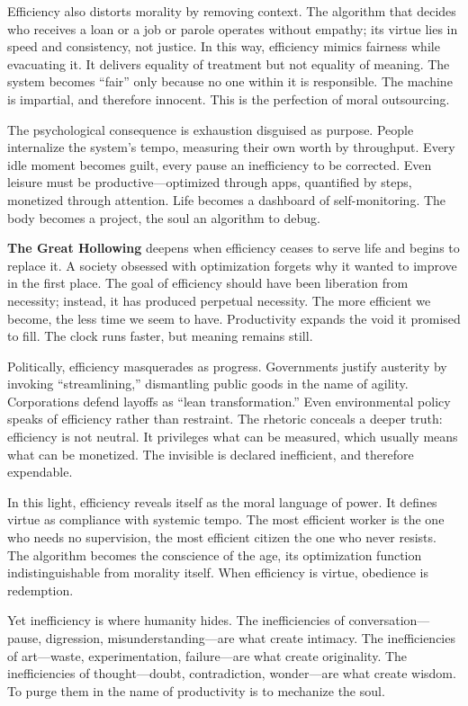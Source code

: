 \documentclass[11pt,twoside]{book}
\begin{document}
Efficiency also distorts morality by removing context.  The algorithm that decides who receives a loan or a job or parole operates without empathy; its virtue lies in speed and consistency, not justice.  In this way, efficiency mimics fairness while evacuating it.  It delivers equality of treatment but not equality of meaning.  The system becomes “fair” only because no one within it is responsible.  The machine is impartial, and therefore innocent.  This is the perfection of moral outsourcing.

The psychological consequence is exhaustion disguised as purpose.  People internalize the system’s tempo, measuring their own worth by throughput.  Every idle moment becomes guilt, every pause an inefficiency to be corrected.  Even leisure must be productive—optimized through apps, quantified by steps, monetized through attention.  Life becomes a dashboard of self-monitoring.  The body becomes a project, the soul an algorithm to debug.

\textbf{The Great Hollowing} deepens when efficiency ceases to serve life and begins to replace it.  A society obsessed with optimization forgets why it wanted to improve in the first place.  The goal of efficiency should have been liberation from necessity; instead, it has produced perpetual necessity.  The more efficient we become, the less time we seem to have.  Productivity expands the void it promised to fill.  The clock runs faster, but meaning remains still.

Politically, efficiency masquerades as progress.  Governments justify austerity by invoking “streamlining,” dismantling public goods in the name of agility.  Corporations defend layoffs as “lean transformation.”  Even environmental policy speaks of efficiency rather than restraint.  The rhetoric conceals a deeper truth: efficiency is not neutral.  It privileges what can be measured, which usually means what can be monetized.  The invisible is declared inefficient, and therefore expendable.

In this light, efficiency reveals itself as the moral language of power.  It defines virtue as compliance with systemic tempo.  The most efficient worker is the one who needs no supervision, the most efficient citizen the one who never resists.  The algorithm becomes the conscience of the age, its optimization function indistinguishable from morality itself.  When efficiency is virtue, obedience is redemption.

Yet inefficiency is where humanity hides.  The inefficiencies of conversation—pause, digression, misunderstanding—are what create intimacy.  The inefficiencies of art—waste, experimentation, failure—are what create originality.  The inefficiencies of thought—doubt, contradiction, wonder—are what create wisdom.  To purge them in the name of productivity is to mechanize the soul.
\end{document}
